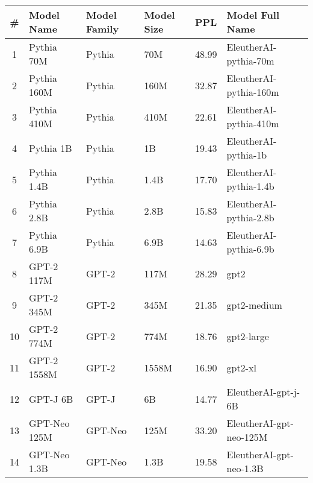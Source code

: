 \begin{table}[ht!]
\centering
\begin{tabular}{|c|l|l|l|l|l|}
\hline
\textbf{\#} & \textbf{Model Name} & \textbf{Model Family} & \textbf{Model Size} & \textbf{PPL} & \textbf{Model Full Name} \\ \hline
1  & Pythia 70M                  & Pythia               & 70M                 & 48.99        & EleutherAI-pythia-70m     \\ \hline
2  & Pythia 160M                 & Pythia               & 160M                & 32.87        & EleutherAI-pythia-160m    \\ \hline
3  & Pythia 410M                 & Pythia               & 410M                & 22.61        & EleutherAI-pythia-410m    \\ \hline
4  & Pythia 1B                   & Pythia               & 1B                  & 19.43        & EleutherAI-pythia-1b      \\ \hline
5  & Pythia 1.4B                 & Pythia               & 1.4B                & 17.70        & EleutherAI-pythia-1.4b    \\ \hline
6  & Pythia 2.8B                 & Pythia               & 2.8B                & 15.83        & EleutherAI-pythia-2.8b    \\ \hline
7  & Pythia 6.9B                 & Pythia               & 6.9B                & 14.63        & EleutherAI-pythia-6.9b    \\ \hline
8  & GPT-2 117M                  & GPT-2                & 117M                & 28.29        & gpt2                      \\ \hline
9  & GPT-2 345M                  & GPT-2                & 345M                & 21.35        & gpt2-medium               \\ \hline
10 & GPT-2 774M                  & GPT-2                & 774M                & 18.76        & gpt2-large                \\ \hline
11 & GPT-2 1558M                 & GPT-2                & 1558M               & 16.90        & gpt2-xl                   \\ \hline
12 & GPT-J 6B                    & GPT-J                & 6B                  & 14.77        & EleutherAI-gpt-j-6B       \\ \hline
13 & GPT-Neo 125M                & GPT-Neo              & 125M                & 33.20        & EleutherAI-gpt-neo-125M   \\ \hline
14 & GPT-Neo 1.3B                & GPT-Neo              & 1.3B                & 19.58        & EleutherAI-gpt-neo-1.3B   \\ \hline

\end{tabular}
\end{table}
